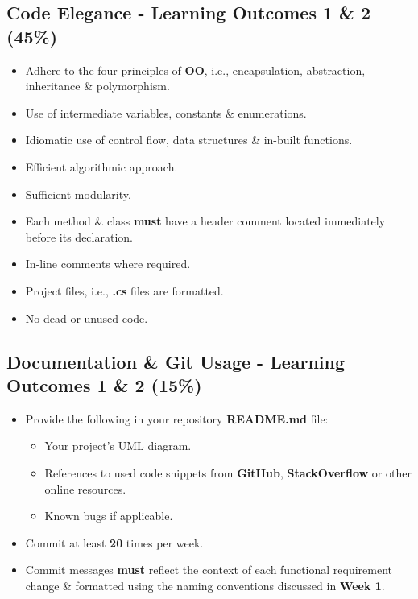 \documentclass{article}
\begin{document}
\subsection*{Code Elegance - Learning Outcomes 1 \& 2  (45\%)}
\begin{itemize}
    \item Adhere to the four principles of \textbf{OO}, i.e., encapsulation, abstraction, inheritance \& polymorphism.
    \item Use of intermediate variables, constants \& enumerations.
    \item Idiomatic use of control flow, data structures \& in-built functions.
    \item Efficient algorithmic approach.
    \item Sufficient modularity.
    \item Each method \& class \textbf{must} have a header comment located immediately before its declaration.
    \item In-line comments where required. 
    \item Project files, i.e., \textbf{.cs} files are formatted. 
    \item No dead or unused code.
\end{itemize}

\subsection*{Documentation \& Git Usage - Learning Outcomes 1 \& 2 (15\%)}
\begin{itemize}
    \item Provide the following in your repository \textbf{README.md} file:
    \begin{itemize}
        \item Your project's UML diagram.
        \item References to used code snippets from \textbf{GitHub}, \textbf{StackOverflow} or other online resources.
        \item Known bugs if applicable.
    \end{itemize}
    \item Commit at least \textbf{20} times per week.
    \item Commit messages \textbf{must} reflect the context of each functional requirement change \& formatted using the naming conventions discussed in \textbf{Week 1}.
\end{itemize}
\end{document}
